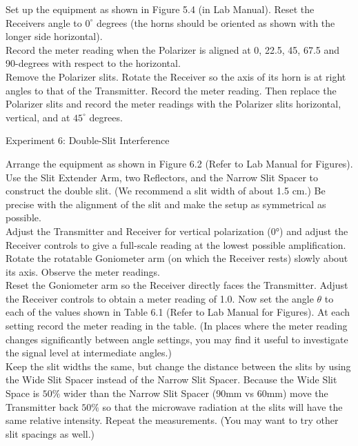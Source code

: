 \documentclass[11pt]{article}
\begin{document}
\noindent Set up the equipment as shown in Figure 5.4 (in Lab Manual). Reset the Receivers angle to $0^\circ$ degrees (the horns should be oriented as shown with the longer side horizontal).\\

\noindent Record the meter reading when the Polarizer is aligned at 0, 22.5, 45, 67.5 and 90-degrees with respect to the horizontal.\\

\noindent Remove the Polarizer slits. Rotate the Receiver so the
axis of its horn is at right angles to that of the Transmitter. Record the meter reading. Then replace the Polarizer slits and record the meter readings with the Polarizer slits horizontal, vertical, and at $45^\circ$ degrees.

\begin{center}
    Experiment 6: Double-Slit Interference
\end{center}
Arrange the equipment as shown in Figure 6.2 (Refer to Lab Manual for Figures). Use the Slit Extender Arm, two Reflectors, and the Narrow Slit Spacer to construct the double slit. (We recommend a slit width of about 1.5 cm.) Be precise with the alignment of the slit and make the setup as symmetrical as possible.\\

\noindent Adjust the Transmitter and Receiver for vertical polarization (0°) and adjust the Receiver controls to give a full-scale reading at the lowest possible amplification.\\

\noindent Rotate the rotatable Goniometer arm (on which the Receiver rests) slowly about its axis. Observe the meter readings.\\

\noindent Reset the Goniometer arm so the Receiver directly faces the Transmitter. Adjust the Receiver controls to obtain a meter reading of 1.0. Now set the angle $\theta$ to each of the values shown in Table 6.1 (Refer to Lab Manual for Figures). At each setting record the meter reading in the table. (In places where the meter reading changes significantly between angle settings, you may find it useful to investigate the signal level at intermediate angles.)\\

\noindent Keep the slit widths the same, but change the distance between the slits by using the Wide Slit Spacer instead of the Narrow Slit Spacer. Because the Wide Slit Space is $50\%$ wider than the Narrow Slit Spacer (90mm vs 60mm) move the Transmitter back $50\%$ so that the microwave radiation at the slits will have the same relative intensity. Repeat the measurements.
(You may want to try other slit spacings as well.)\\
\end{document}
